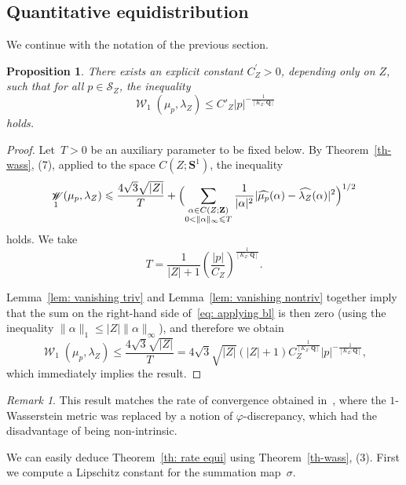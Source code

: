 \documentclass[12pt]{amsart}
\renewcommand{\mathcal}{\mathscr}
\renewcommand{\leq}{\leqslant}
\newcommand{\Zz}{\mathbf{Z}}
\newcommand{\Ss}{\mathbf{S}}
\newcommand{\Qq}{\mathbf{Q}}
\renewcommand{\hat}{\widehat}
\DeclareMathOperator{\wass}{\mathcal{W}}
\theoremstyle{plain}
\newtheorem{proposition}[theorem]{Proposition}
\theoremstyle{remark}
\newtheorem*{rem}{Remark}
\theoremstyle{definition}
\newcommand{\mcS}{\mathcal{S}}
\renewcommand{\leq}{\leqslant}
\begin{document}
\subsection{Quantitative equidistribution}\label{sec: quantitative rate}

We continue with the notation of the previous section.

\begin{proposition}\label{pr-wass-mug}
  There exists an explicit constant $C^{'}_Z >0$, depending only on $Z$,
  such that for all $p \in \mcS_Z$, the inequality
  \[
    \wass_1(\mu_p, \lambda_Z) \leq C'_Z |p|^{-\frac{1}{[K_Z: \Qq]}}
  \]
  holds.
\end{proposition}

\begin{proof}
  Let~$T>0$ be an auxiliary parameter to be fixed below. By
  Theorem~\ref{th-wass}, (7), applied to the space $C(Z;\Ss^1)$, the
  inequality
  \begin{equation}\label{eq: applying bl}
    \wass_1(\mu_p,\lambda_Z)
    \leqslant \frac{4 \sqrt{3}\sqrt{|Z|}}{T} +
    \Bigl(\sum_{\substack{\alpha \in C(Z; \Zz) \\ 0 <
        \|\alpha\|_{\infty} \leqslant T}}
    \frac{1}{|\alpha|^2}|\hat{\mu_p}(\alpha) -
    \hat{\lambda_Z}(\alpha)|^2\Bigr)^{1/2}
  \end{equation}
  holds. We take
  \[
    T = \frac{1}{|Z|+1}
    \left(\frac{|p|}{C_Z}\right)^{\frac{1}{[K_Z:\Qq]}}.
  \]

  Lemma~\ref{lem: vanishing triv} and Lemma~\ref{lem: vanishing nontriv}
  together imply that the sum on the right-hand side of~\eqref{eq:
    applying bl} is then zero (using the inequality
  $\| \alpha\|_1 \leqslant |Z| \|\alpha \|_{\infty}$), and therefore we
  obtain
  \[
    \wass_1(\mu_p, \lambda_Z) \leq \frac{4 \sqrt{3}\sqrt{|Z|}}{T} = 4
    \sqrt{3}\sqrt{|Z|} (|Z|+1) C_Z^{\frac{1}{[K_Z:\Qq]}}
    |p|^{-\frac{1}{[K_Z:\Qq]}},
  \]
  which immediately implies the result.
\end{proof}


\begin{rem}
  This result matches the rate of convergence obtained
  in~\cite[Th. 5.30]{mathese}, where the $1$-Wasserstein metric was
  replaced by a notion of $\varphi$-discrepancy, which had the
  disadvantage of being non-intrinsic.
\end{rem}

We can easily deduce Theorem~\ref{th: rate equi} using
Theorem~\ref{th-wass}, (3). First we compute a Lipschitz constant for
the summation map~$\sigma$.
\end{document}
